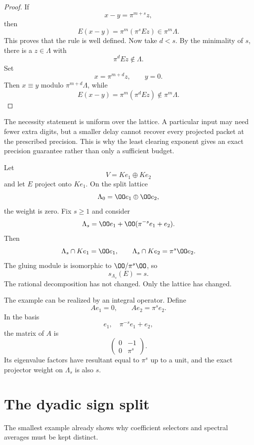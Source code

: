 \begin{proof}
If
\[
x-y=\pi^{m+s}z,
\]
then
\[
E(x-y)=\pi^m(\pi^sEz)\in\pi^m\Lambda.
\]
This proves that the rule is well defined.  Now take $d<s$.  By the minimality of $s$, there is a $z\in\Lambda$ with
\[
\pi^dEz\notin\Lambda.
\]
Set
\[
x=\pi^{m+d}z,
\qquad
y=0.
\]
Then $x\equiv y$ modulo $\pi^{m+d}\Lambda$, while
\[
E(x-y)=\pi^m(\pi^dEz)\notin\pi^m\Lambda.
\]
\end{proof}

\begin{keyidea}
The necessity statement is uniform over the lattice. A particular input may need fewer extra digits, but a smaller delay cannot recover every projected packet at the prescribed precision. This is why the least clearing exponent gives an exact precision guarantee rather than only a sufficient budget.
\end{keyidea}

\begin{example}\label{ex:lattice_dependence}
Let
\[
V=Ke_1\oplus Ke_2
\]
and let $E$ project onto $Ke_1$.  On the split lattice
\[
\Lambda_0=\OO e_1\oplus\OO e_2,
\]
the weight is zero.  Fix $s\geq1$ and consider
\[
\Lambda_s
=
\OO e_1+
\OO(\pi^{-s}e_1+e_2).
\]
Then
\[
\Lambda_s\cap Ke_1=\OO e_1,
\qquad
\Lambda_s\cap Ke_2=\pi^s\OO e_2.
\]
The gluing module is isomorphic to $\OO/\pi^s\OO$, so
\[
s_{\Lambda_s}(E)=s.
\]
The rational decomposition has not changed.  Only the lattice has changed.
\end{example}

The example can be realized by an integral operator.  Define
\[
Ae_1=0,
\qquad
Ae_2=\pi^se_2.
\]
In the basis
\[
e_1,
\quad
\pi^{-s}e_1+e_2,
\]
the matrix of $A$ is
\[
\begin{pmatrix}
0&-1\\
0&\pi^s
\end{pmatrix}.
\]
Its eigenvalue factors have resultant equal to $\pi^s$ up to a unit, and the exact projector weight on $\Lambda_s$ is also $s$.

\section{The dyadic sign split}\label{sec:dyadic}

The smallest example already shows why coefficient selectors and spectral averages must be kept distinct.

